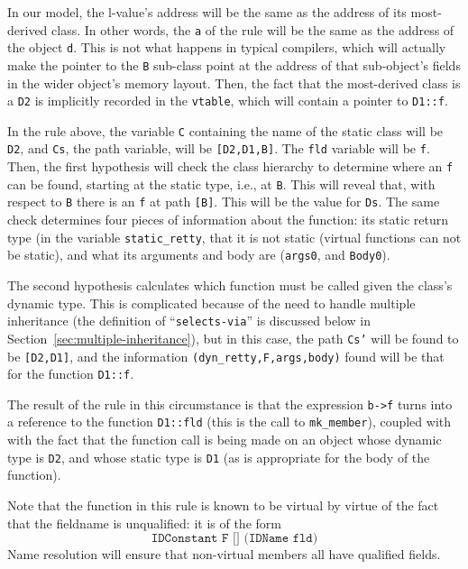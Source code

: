 \documentclass[11pt]{article}
\begin{document}
In our model, the l-value's address will be the same as the address of
its most-derived class.  In other words, the \texttt{a} of the rule
will be the same as the address of the object \texttt{d}.  This is not
what happens in typical compilers, which will actually make the
pointer to the \texttt{B} sub-class point at the address of that
sub-object's fields in the wider object's memory layout.  Then, the
fact that the most-derived class is a \texttt{D2} is implicitly
recorded in the \texttt{vtable}, which will contain a pointer to
\texttt{D1::f}.

In the rule above, the variable \texttt{C} containing the name of the
static class will be \texttt{D2}, and \texttt{Cs}, the path variable,
will be \texttt{[D2,D1,B]}.  The \texttt{fld} variable will be
\texttt{f}.  Then, the first hypothesis will check the class hierarchy
to determine where an \texttt{f} can be found, starting at the static
type, i.e., at \texttt{B}.  This will reveal that, with respect to
\texttt{B} there is an \texttt{f} at path \texttt{[B]}.  This will be
the value for \texttt{Ds}.  The same check determines four pieces of
information about the function: its static return type (in the
variable \texttt{static_retty}, that it is not static (virtual
functions can not be static), and what its arguments and body are
(\texttt{args0}, and \texttt{Body0}).

The second hypothesis calculates which function must be called given
the class's dynamic type.  This is complicated because of the need to
handle multiple inheritance (the definition of
``\texttt{selects-via}'' is discussed below in
Section~\ref{sec:multiple-inheritance}), but in this case, the path
\texttt{Cs'} will be found to be \texttt{[D2,D1]}, and the information
\texttt{(dyn_retty,F,args,body)} found will be that for the function
\texttt{D1::f}.  

The result of the rule in this circumstance is that the expression
\texttt{b->f} turns into a reference to the function \texttt{D1::fld}
(this is the call to \texttt{mk_member}), coupled with with the fact
that the function call is being made on an object whose dynamic type
is \texttt{D2}, and whose static type is \texttt{D1} (as is
appropriate for the body of the function).

Note that the function in this rule is known to be virtual by virtue
of the fact that the fieldname is unqualified: it is of the form
\[
\texttt{IDConstant~F~[]~(IDName~fld)}
\]
Name resolution will ensure that non-virtual members all have
qualified fields.
\end{document}
